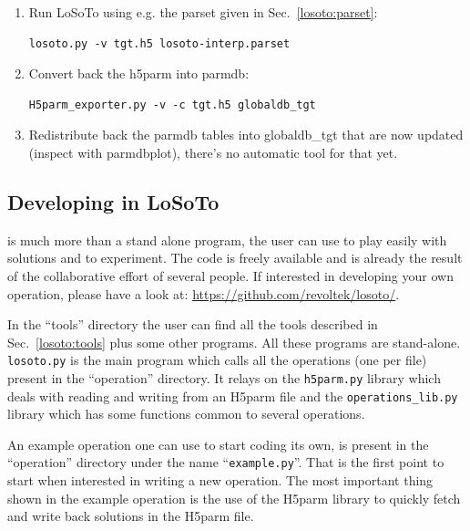 \documentclass[]{article}
\begin{document}
\begin{enumerate}
\item Run LoSoTo using e.g. the parset given in Sec.~\ref{losoto:parset}:
\begin{verbatim}
losoto.py -v tgt.h5 losoto-interp.parset
\end{verbatim}

\item Convert back the h5parm into parmdb:
\begin{verbatim}
H5parm_exporter.py -v -c tgt.h5 globaldb_tgt
\end{verbatim}

\item Redistribute back the parmdb tables into globaldb\_tgt that are now updated (inspect with parmdbplot), there's no automatic tool for that yet.
\end{enumerate}

\subsection{Developing in LoSoTo}
\label{losoto:developing}
\losoto{} is much more than a stand alone program, the user can use \losoto{} to play easily with solutions and to experiment. The code is freely available and is already the result of the collaborative effort of several people. If interested in developing your own operation, please have a look at: \url{https://github.com/revoltek/losoto/}.

In the ``tools'' directory the user can find all the tools described in Sec.~\ref{losoto:tools} plus some other programs. All these programs are stand-alone. \texttt{losoto.py} is the main program which calls all the operations (one per file) present in the ``operation'' directory. It relays on the \texttt{h5parm.py} library which deals with reading and writing from an H5parm file and the \texttt{operations\_lib.py} library which has some functions common to several operations.

An example operation one can use to start coding its own, is present in the ``operation'' directory under the name ``\texttt{example.py}''. That is the first point to start when interested in writing a new operation. The most important thing shown in the example operation is the use of the H5parm library to quickly fetch and write back solutions in the H5parm file.
\end{document}
